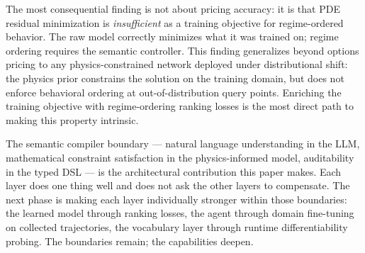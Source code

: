 \documentclass[11pt,a4paper]{article}
\begin{document}
The most consequential finding is not about pricing accuracy: it is that PDE residual
minimization is \emph{insufficient} as a training objective for regime-ordered
behavior. The raw model correctly minimizes what it was trained on; regime ordering
requires the semantic controller. This finding generalizes beyond options pricing to
any physics-constrained network deployed under distributional shift: the physics prior
constrains the solution on the training domain, but does not enforce behavioral
ordering at out-of-distribution query points. Enriching the training objective with
regime-ordering ranking losses is the most direct path to making this property intrinsic.

The semantic compiler boundary --- natural language understanding in the LLM,
mathematical constraint satisfaction in the physics-informed model, auditability in
the typed DSL --- is the architectural contribution this paper makes. Each layer does
one thing well and does not ask the other layers to compensate. The next phase is
making each layer individually stronger within those boundaries: the learned model
through ranking losses, the agent through domain fine-tuning on collected trajectories,
the vocabulary layer through runtime differentiability probing. The boundaries remain;
the capabilities deepen.



\end{document}

